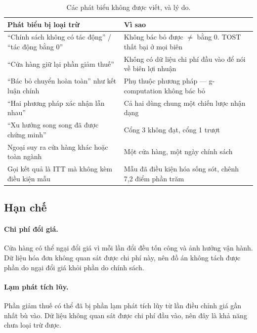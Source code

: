 \documentclass[11pt]{article}
\begin{document}
\begin{table}[htbp]
  \centering
  \caption{Các phát biểu không được viết, và lý do.}
  \label{tab:cau-cam}
  \begin{tabular}{p{6.4cm}p{7.6cm}}
    \toprule
    Phát biểu bị loại trừ & Vì sao \\
    \midrule
    ``Chính sách không có tác động'' / ``tác động bằng 0''
    & Không bác bỏ được $\ne$ bằng 0. TOST thất bại ở mọi biên \\
    \addlinespace
    ``Cửa hàng giữ lại phần giảm thuế''
    & Không có dữ liệu chi phí đầu vào để nói về biên lợi nhuận \\
    \addlinespace
    ``Bác bỏ chuyển hoàn toàn'' như kết luận chính
    & Phụ thuộc phương pháp --- g-computation không bác bỏ \\
    \addlinespace
    ``Hai phương pháp xác nhận lẫn nhau''
    & Cả hai dùng chung một chiến lược nhận dạng \\
    \addlinespace
    ``Xu hướng song song đã được chứng minh''
    & Cổng 3 không đạt, cổng 1 trượt \\
    \addlinespace
    Ngoại suy ra cửa hàng khác hoặc toàn ngành
    & Một cửa hàng, một ngày chính sách \\
    \addlinespace
    Gọi kết quả là ITT mà không kèm điều kiện mẫu
    & Mẫu đã điều kiện hóa sống sót, chênh 7,2 điểm phần trăm \\
    \bottomrule
  \end{tabular}
\end{table}

\subsection{Hạn chế}

\paragraph{Chi phí đổi giá.} Cửa hàng có thể ngại đổi giá vì mỗi lần đổi đều tốn công và ảnh hưởng
vận hành. Dữ liệu hóa đơn không quan sát được chi phí này, nên đồ án không tách được phần do ngại
đổi giá khỏi phần do chính sách.

\paragraph{Lạm phát tích lũy.} Phần giảm thuế có thể đã bị phần lạm phát tích lũy từ lần điều chỉnh
giá gần nhất bù vào. Dữ liệu không quan sát được chi phí đầu vào, nên đây là khả năng chưa loại trừ
được.
\end{document}
